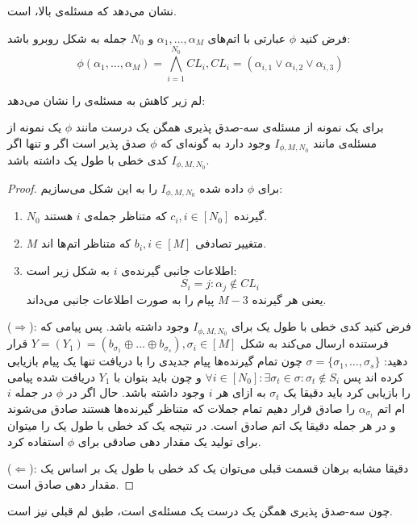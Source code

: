 \cite{10.1145/800133.804350}
نشان می‌دهد که مسئله‌ی بالا، 
\nphard
است.

فرض کنید
$\phi$
عبارتی با اتم‌های
$\alpha_1, \ldots, \alpha_M$
و
$N_0$
جمله به شکل روبرو باشد:
$$\phi(\alpha_1, \ldots, \alpha_M) = \bigwedge\limits_{i = 1}^{N_0} CL_i, CL_i = (\alpha_{i, 1} \vee \alpha_{i, 2} \vee \alpha_{i, 3})$$

لم زیر کاهش به مسئله‌ی
\picod
را نشان می‌دهد:
\begin{lemma}
	برای یک نمونه از مسئله‌ی سه-صدق پذیری همگن یک درست مانند
	$\phi$
	یک نمونه از مسئله‌ی
	\picod
	مانند
	$I_{\phi, M, N_0}$
	وجود دارد به گونه‌ای که 
	$\phi$
	صدق پذیر است اگر و تنها اگر 
	$I_{\phi, M, N_0}$
	کدی خطی با طول یک داشته باشد.
\end{lemma}
\begin{proof}
	برای
	$\phi$
	داده شده
		$I_{\phi, M, N_0}$
		را به این شکل می‌سازیم:
		\begin{enumerate}
			\item
			$N_0$
			گیرنده
			$c_i, i \in [N_0]$
			که متناظر جمله‌ی
			$i$
			هستند.
			\item
			$M$
			متغییر تصادفی
			$b_i, i \in [M]$
			 که متناظر اتم‌ها اند.
			 \item 
			 اطلاعات جانبی گیرنده‌ی
			 $i$
			 به شکل زیر است:
			 $$S_i = {j: \alpha_j \notin CL_i}$$
			 یعنی هر گیرنده
			 $M - 3$
			 پیام را به صورت اطلاعات جانبی می‌داند.
		\end{enumerate}
		($\Rightarrow$):
		فرض کنید کدی خطی با طول یک برای
			$I_{\phi, M, N_0}$
			وجود داشته باشد. پس پیامی که فرستنده ارسال می‌کند به شکل
			$Y = (Y_1) = (b_{\sigma_1} \oplus \ldots \oplus b_{\sigma_s}), \sigma_i \in [M]$
			قرار دهید: 
			$\sigma = \{ \sigma_1, \ldots, \sigma_s \}$
			چون تمام گیرنده‌ها پیام جدیدی را با دریافت تنها یک پیام بازیابی کرده اند پس
			$\forall i \in [N_0]: \exists \sigma_t \in \sigma: \sigma_t \notin S_i$
			و چون باید بتوان با 
			$Y_1$
			دریافت شده پیامی را بازیابی کرد باید دقیقا یک
			$\sigma_t$
			به ازای هر
			$i$
			وجود داشته باشد. حال اگر در
			$\phi$
			در جمله
			$i$
			ام اتم
			$\alpha_{\sigma_t}$
			را صادق قرار دهیم تمام جملات که متناظر گیرنده‌ها هستند صادق می‌شوند و در هر جمله دقیقا یک اتم صادق است. در نتیجه یک کد خطی با طول یک را میتوان برای تولید یک مقدار دهی صادقی برای
			$\phi$
			استفاده کرد.
			
			($\Leftarrow$):
			دقیقا مشابه برهان قسمت قبلی می‌توان یک کد خطی با طول یک بر اساس یک مقدار دهی صادق است.
\end{proof}
چون سه-صدق پذیری همگن یک درست یک مسئله‌ی
\nphard
است، طبق لم قبلی 
\picod
نیز
\nphard
است.
